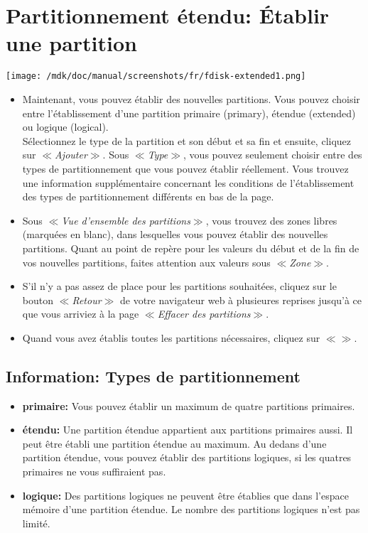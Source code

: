 \section{Partitionnement \'etendu: \'Etablir une partition}
\texttt{[image: /mdk/doc/manual/screenshots/fr/fdisk-extended1.png]} \\
\begin{itemize}
\item Maintenant, vous pouvez \'etablir des nouvelles partitions. Vous pouvez choisir entre l'\'etablissement d'une partition primaire (primary), \'etendue (extended) ou logique (logical).\\
S\'electionnez le type de la partition et son d\'ebut et sa fin et ensuite, cliquez sur \textit{$\ll$Ajouter$\gg$}. Sous \textit{$\ll$Type$\gg$}, vous pouvez seulement choisir entre des types de partitionnement que vous pouvez \'etablir r\'eellement. Vous trouvez une information suppl\'ementaire concernant les conditions de l'\'etablissement des types de partitionnement diff\'erents en bas de la page.\\
\item Sous \textit{$\ll$Vue d'ensemble des partitions$\gg$}, vous trouvez des zones libres (marqu\'ees en blanc), dans lesquelles vous pouvez \'etablir des nouvelles partitions. Quant au point de rep\`ere pour les valeurs du d\'ebut et de la fin de vos nouvelles partitions, faites attention aux valeurs sous \textit{$\ll$Zone$\gg$}.\\
\item S'il n'y a pas assez de place pour les partitions souhait\'ees, cliquez sur le bouton \textit{$\ll$Retour$\gg$} de votre navigateur web \`a plusieures reprises jusqu'\`a ce que vous arriviez \`a la page \textit{$\ll$Effacer des partitions$\gg$}.\\
\item Quand vous avez \'etablis toutes les partitions n\'ecessaires, cliquez sur \textit{$\ll$$\gg$}.\\
\end{itemize}
\subsection{Information: Types de partitionnement}
\begin{itemize}
 \item \textbf{primaire:} Vous pouvez \'etablir un maximum de quatre partitions primaires.\\
 \item \textbf{\'etendu:} Une partition \'etendue appartient aux partitions primaires aussi. Il peut \^etre \'etabli une partition \'etendue au maximum. Au dedans d'une partition \'etendue, vous pouvez \'etablir des partitions logiques, si les quatres primaires ne vous suffiraient pas.\\
 \item \textbf{logique:} Des partitions logiques ne peuvent \^etre \'etablies que dans l'espace m\'emoire d'une partition \'etendue. Le nombre des partitions logiques n'est pas limit\'e.\\
\end{itemize}
